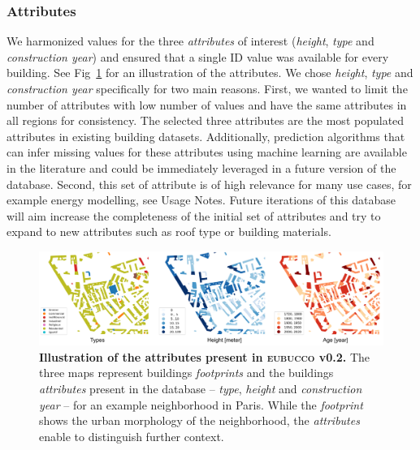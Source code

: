 \documentclass[fleqn,10pt]{wlscirep}
\begin{document}
\subsubsection*{Attributes} 
We harmonized values for the three \textit{attributes} of interest (\textit{height}, \textit{type} and \textit{construction year}) and ensured that a single ID value was available for every building. See Fig~\ref{fig:db_content} for an illustration of the attributes. We chose \textit{height}, \textit{type} and \textit{construction year} specifically for two main reasons. First, we wanted to limit the number of attributes with low number of values and have the same attributes in all regions for consistency. The selected three attributes are the most populated attributes in existing building datasets\cite{biljecki2021open}. Additionally, prediction algorithms that can infer missing values for these attributes using machine learning are available in the literature\cite{milojevic2020learning,rosser2019predicting,sturrock2018predicting} and could be immediately leveraged in a future version of the database. Second, this set of attribute is of high relevance for many use cases, for example energy modelling, see Usage Notes. Future iterations of this database will aim increase the completeness of the initial set of attributes and try to expand to new attributes such as roof type or building materials.

\begin{figure}[h]
\centering
\includegraphics[width=\linewidth]{figs/db_content.png}
\caption{\textbf{Illustration of the attributes present in \textsc{eubucco} v0.2.} The three maps represent buildings \textit{footprints} and the buildings \textit{attributes} present in the database -- \textit{type}, \textit{height} and \textit{construction year} -- for an example neighborhood in Paris. While the \textit{footprint} shows the urban morphology of the neighborhood, the \textit{attributes} enable to distinguish further context.}
\label{fig:db_content}
\end{figure}
\end{document}
